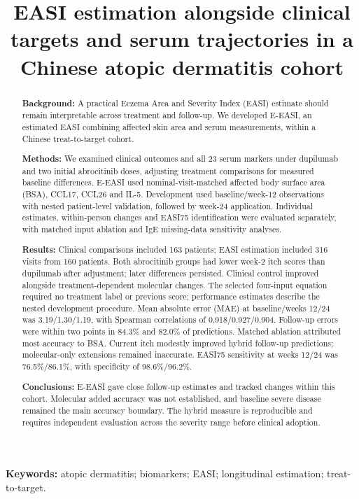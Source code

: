 \documentclass[10pt,a4paper]{article}
\title{EASI estimation alongside clinical targets and serum trajectories in a Chinese atopic dermatitis cohort}
\author{}
\date{}
\begin{document}
\maketitle
\begin{abstract}
\textbf{Background:} A practical Eczema Area and Severity Index (EASI) estimate should remain interpretable across treatment and follow-up. We developed E-EASI, an estimated EASI combining affected skin area and serum measurements, within a Chinese treat-to-target cohort.

\textbf{Methods:} We examined clinical outcomes and all 23 serum markers under dupilumab and two initial abrocitinib doses, adjusting treatment comparisons for measured baseline differences. E-EASI used nominal-visit-matched affected body surface area (BSA), CCL17, CCL26 and IL-5. Development used baseline/week-12 observations with nested patient-level validation, followed by week-24 application. Individual estimates, within-person changes and EASI75 identification were evaluated separately, with matched input ablation and IgE missing-data sensitivity analyses.

\textbf{Results:} Clinical comparisons included 163 patients; EASI estimation included 316 visits from 160 patients. Both abrocitinib groups had lower week-2 itch scores than dupilumab after adjustment; later differences persisted. Clinical control improved alongside treatment-dependent molecular changes. The selected four-input equation required no treatment label or previous score; performance estimates describe the nested development procedure. Mean absolute error (MAE) at baseline/weeks 12/24 was 3.19/1.30/1.19, with Spearman correlations of 0.918/0.927/0.904. Follow-up errors were within two points in 84.3\% and 82.0\% of predictions. Matched ablation attributed most accuracy to BSA. Current itch modestly improved hybrid follow-up predictions; molecular-only extensions remained inaccurate. EASI75 sensitivity at weeks 12/24 was 76.5\%/86.1\%, with specificity of 98.6\%/96.2\%.

\textbf{Conclusions:} E-EASI gave close follow-up estimates and tracked changes within this cohort. Molecular added accuracy was not established, and baseline severe disease remained the main accuracy boundary. The hybrid measure is reproducible and requires independent evaluation across the severity range before clinical adoption.

\end{abstract}
\textbf{Keywords:} atopic dermatitis; biomarkers; EASI; longitudinal estimation; treat-to-target.
\end{document}
